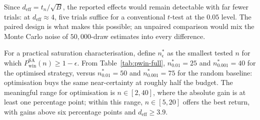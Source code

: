 Since $d_{\mathrm{eff}} = t_n/\sqrt{B}$, the reported effects would remain
detectable with far fewer trials: at $d_{\mathrm{eff}} \approx 4$, five
trials suffice for a conventional $t$-test at the $0.05$ level.  The
paired design is what makes this possible; an unpaired comparison would
mix the Monte Carlo noise of $50{,}000$-draw estimates into every
difference.

For a practical saturation characterisation, define $n^*_\epsilon$ as the
smallest tested $n$ for which $P_{\mathrm{win}}^{\mathrm{SA}}(n) \ge
1-\epsilon$.  From Table~\ref{tab:pwin-full}, $n^*_{0.01} = 25$ and
$n^*_{0.001} = 40$ for the optimised strategy, versus $n^*_{0.01} = 50$
and $n^*_{0.001} = 75$ for the random baseline: optimisation buys the same
near-certainty at roughly half the budget.  The meaningful range for
optimisation is $n \in [2, 40]$, where the absolute gain is at least one
percentage point; within this range, $n \in [5, 20]$ offers the best
return, with gains above six percentage points and $d_{\mathrm{eff}} \ge
3.9$.
